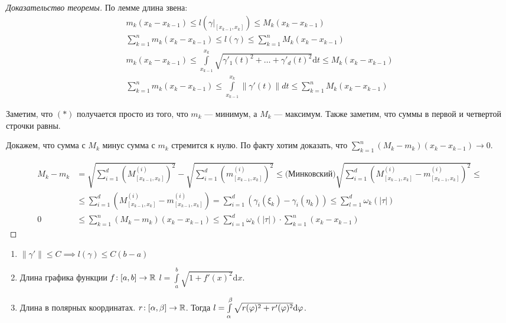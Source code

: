 \begin{proof}[Доказательство теоремы]
   По лемме длина звена:
   \begin{align*}
       m_k(x_k - x_{k-1}) \le l(\gamma \Big|_{[x_{k-1}, x_k]}) \le M_k(x_k - x_{k-1}) \\
       \sum_{k=1}^n m_k (x_k - x_{k-1}) \le l(\gamma) \le \sum_{k=1}^n M_k(x_k - x_{k-1}) \\
       m_k(x_k - x_{k-1}) \le \int\limits_{x_{k-1}}^{x_k} \sqrt{\gamma'_1(t)^2 + \ldots + \gamma'_d(t)^2}\mathrm{d}t \le M_k(x_{k} - x_{k-1})\tag{*}\\
       \sum\limits_{k=1}^n m_k(x_k - x_{k-1}) \le \int\limits_{x_{k-1}}^{x_k} \|\gamma'(t)\| dt \le \sum\limits_{k=1}^n M_k(x_k - x_{k-1})
   \end{align*}
   
   Заметим, что $(*)$ получается просто из того, что $m_k$ --- минимум, а  $M_k$ --- максимум. Также заметим, что суммы в первой и четвертой строчки равны. 
   
   Докажем, что сумма с $M_k$ минус сумма с $m_k$ стремится к нулю. По факту хотим доказать, что $\sum\limits_{k=1}^n (M_k - m_k)(x_k - x_{k-1}) \to 0$. 

    \begin{align*}
        M_k - m_k &= \sqrt{\sum_{i=1}^d (M_{[x_{k-1}, x_k]}^{(i)})^2} - \sqrt{\sum_{i=1}^d (m_{[x_{k-1}, x_k]}^{(i)})^2}  \le\text{(Минковский)} \sqrt{\sum_{i=1}^d (M_{[x_{k-1}, x_k]}^{(i)} - m_{[x_{k-1}, x_k]}^{(i)})^2} \le \\ 
                  &\le \sum_{i=1}^d (M_{[x_{k-1}, x_k]}^{(i)} - m_{[x_{k-1}, x_k]}^{(i)}) = \sum_{i=1}^d (\gamma_i(\xi_k) - \gamma_i(\eta_k)) \le \sum_{l=1}^d \omega_k(|\tau|)\\
        0 &\le \sum_{k=1}^n (M_k - m_k)(x_k - x_{k-1}) \le \sum_{i=1}^d \omega_k(|\tau|) \cdot \sum_{k=1}^n (x_k - x_{k-1})
   \end{align*}
\end{proof}
\begin{consequence}
    \begin{enumerate}
        \item $\| \gamma' \| \le C \implies l(\gamma) \le C(b-a)$
        \item Длина графика функции $f\!: [a, b] \to \mathbb{R}$  $l = \int\limits_a^b \sqrt{1 + f'(x)^2} \mathrm{d}x$.
        \item Длина в полярных координатах. $r\!: [\alpha, \beta] \to \mathbb{R}$. Тогда  $l = \int\limits_\alpha^\beta \sqrt{r(\varphi)^2 + r'(\varphi)^2} \mathrm{d}\varphi$. 
    \end{enumerate}
\end{consequence}
